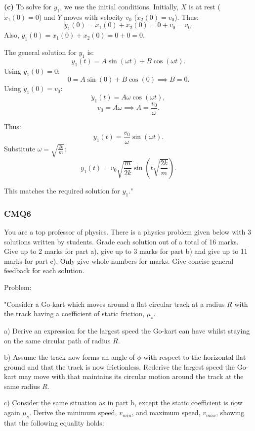 \vspace{0.5cm}

\textbf{(c)} To solve for $y_1$, we use the initial conditions. Initially, $X$ is at rest ($\dot{x}_1(0) = 0$) and $Y$ moves with velocity $v_0$ ($\dot{x}_2(0) = v_0$). Thus:
\[
\dot{y}_1(0) = \dot{x}_1(0) + \dot{x}_2(0) = 0 + v_0 = v_0.
\]
Also, $y_1(0) = x_1(0) + x_2(0) = 0 + 0 = 0$.

The general solution for $y_1$ is:
\[
y_1(t) = A\sin\left(\omega t\right) + B\cos\left(\omega t\right).
\]
Using $y_1(0) = 0$:
\[
0 = A\sin(0) + B\cos(0) \implies B = 0.
\]
Using $\dot{y}_1(0) = v_0$:
\[
\dot{y}_1(t) = A\omega\cos(\omega t),
\]
\[
v_0 = A\omega \implies A = \frac{v_0}{\omega}.
\]

Thus:
\[
y_1(t) = \frac{v_0}{\omega}\sin(\omega t).
\]
Substitute $\omega = \sqrt{\frac{2k}{m}}$:
\[
y_1(t) = v_0\sqrt{\frac{m}{2k}}\sin\left(t\sqrt{\frac{2k}{m}}\right).
\]

This matches the required solution for $y_1$."

\subsubsection{CMQ6}

You are a top professor of physics. There is a physics problem given below with 3 solutions written by students. Grade each solution out of a total of 16 marks. Give up to 2 marks for part a), give up to 3 marks for part b) and give up to 11 marks for part c). Only give whole numbers for marks. Give concise general feedback for each solution.

Problem: 

"Consider a Go-kart which moves around a flat circular track at a radius \( R \) with the track having a coefficient of static friction, \( \mu_{s} \). 

a) Derive an expression for the largest speed the Go-kart can have whilst staying on the same circular path of radius \( R \). 
    
b) Assume the track now forms an angle of \( \phi \) with respect to the horizontal flat ground and that the track is now frictionless. Rederive the largest speed the Go-kart may move with that maintains its circular motion around the track at the same radius \( R \). 
    
c) Consider the same situation as in part b, except the static coefficient is now again \( \mu_{s} \). Derive the minimum speed, \( v_{min} \), and maximum speed, \( v_{max} \), showing that the following equality holds:
    
